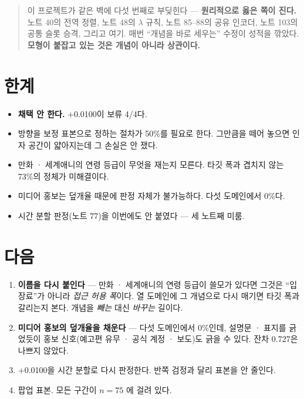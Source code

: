 \documentclass[10pt]{article}
\begin{document}
\begin{quote}\fontsize{9.5}{11.5}\selectfont
이 프로젝트가 같은 벽에 다섯 번째로 부딪힌다 --- \textbf{원리적으로 옳은 쪽이
진다.} 노트 40의 전역 정렬, 노트 48의 $\lambda$ 규칙, 노트 85--88의 공유
인코더, 노트 103의 공통 슬롯 승격, 그리고 여기. 매번 ``개념을 바로 세우는''
수정이 성적을 깎았다. \textbf{모형이 붙잡고 있는 것은 개념이 아니라 상관이다.}
\end{quote}

\section{한계}

\begin{itemize}[leftmargin=1.1em,itemsep=0.15em]
\item \textbf{채택 안 한다.} $+$0.0100이 보류 4/4다.
\item 방향을 보정 표본으로 정하는 절차가 50\%를 필요로 한다. 그만큼을 떼어
      놓으면 인자 공간이 얇아지는데 그 손실은 안 쟀다.
\item 만화 · 세계애니의 연령 등급이 무엇을 재는지 모른다. 타깃 폭과 겹치지
      않는 73\%의 정체가 미해결이다.
\item 미디어 홍보는 덮개율 때문에 판정 자체가 불가능하다. 다섯 도메인에서
      0\%다.
\item 시간 분할 판정(노트 77)을 이번에도 안 붙였다 --- 세 노트째 미룸.
\end{itemize}

\section{다음}

\begin{enumerate}[leftmargin=1.3em,itemsep=0.15em]
\item \textbf{이름을 다시 붙인다} --- 만화 · 세계애니의 연령 등급이 쓸모가
      있다면 그것은 ``입장료''가 아니라 \emph{접근 허용 폭}이다. 열 도메인에
      그 개념으로 다시 매기면 타깃 폭과 갈리는지 본다. 개념을 \emph{빼는} 대신
      \emph{바꾸는} 길이다.
\item \textbf{미디어 홍보의 덮개율을 채운다} --- 다섯 도메인에서 0\%인데,
      설명문 · 표지를 긁었듯이 홍보 신호(예고편 유무 · 공식 계정 · 보도)도
      긁을 수 있다. 잔차 0.727은 나쁘지 않았다.
\item $+$0.0100을 시간 분할로 다시 판정한다. 반쪽 검정과 달리 표본을 안 줄인다.
\item 팝업 표본. 모든 구간이 $n{=}75$ 에 걸려 있다.
\end{enumerate}
\end{document}
